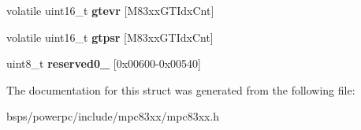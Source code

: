 \begin{DoxyCompactItemize}
\begin{tabbing}
\end{tabbing}\item 
\mbox{\label{structm83xxGTMRegisters___aded5c5b02d103a1321fb8a37f924ef97}} 
volatile uint16\+\_\+t {\bfseries gtevr} \mbox{[}M83xx\+G\+T\+Idx\+Cnt\mbox{]}
\item 
\mbox{\label{structm83xxGTMRegisters___aa8d12bffb47cfc967370c67eaa6e85cd}} 
volatile uint16\+\_\+t {\bfseries gtpsr} \mbox{[}M83xx\+G\+T\+Idx\+Cnt\mbox{]}
\item 
\mbox{\label{structm83xxGTMRegisters___a86ce59276c388e54713331720df2d79d}} 
uint8\+\_\+t {\bfseries reserved0\+\_} \mbox{[}0x00600-\/0x00540\mbox{]}
\end{DoxyCompactItemize}


The documentation for this struct was generated from the following file\+:\begin{DoxyCompactItemize}
\item 
bsps/powerpc/include/mpc83xx/mpc83xx.\+h\end{DoxyCompactItemize}
